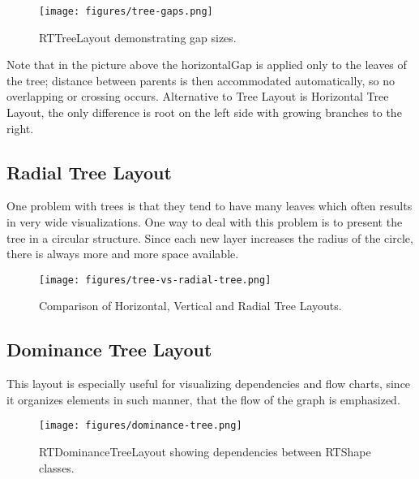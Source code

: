 \documentclass[a4paper,10pt,twoside]{book}
\begin{document}
\begin{figure}

\begin{center}
\texttt{[image: figures/tree-gaps.png]}\caption{RTTreeLayout demonstrating gap sizes.\label{tree-gaps}}\end{center}
\end{figure}


Note that in the picture above the horizontalGap is applied only to the leaves of the tree; distance between parents is then accommodated automatically, so no overlapping or crossing occurs. Alternative to Tree Layout is Horizontal Tree Layout, the only difference is root on the left side with growing branches to the right.
\subsection{ Radial Tree Layout}
One problem with trees is that they tend to have many leaves which often results in very wide visualizations. One way to deal with this problem is to present the tree in a circular structure.
Since each new layer increases the radius of the circle, there is always more and more space available.


\begin{figure}

\begin{center}
\texttt{[image: figures/tree-vs-radial-tree.png]}\caption{Comparison of Horizontal, Vertical and Radial Tree Layouts.\label{tree-vs-radial-tree}}\end{center}
\end{figure}

\subsection{ Dominance Tree Layout}
This layout is especially useful for visualizing dependencies and flow charts, since it organizes elements in such manner, that the flow of the graph is emphasized.


\begin{figure}

\begin{center}
\texttt{[image: figures/dominance-tree.png]}\caption{ RTDominanceTreeLayout showing dependencies between RTShape classes.\label{dominance-tree}}\end{center}
\end{figure}
\end{document}
